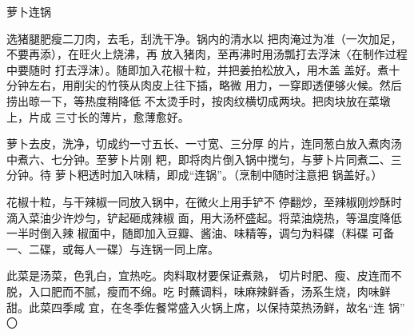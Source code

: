 \begin{recipe}{萝卜连锅}

\ingredients




\cooking

\step 选猪腿肥瘦二刀肉，去毛，刮洗干净。锅内的清水以 把肉淹过为准（一次加足，不要再添），在旺火上烧沸，再 放入猪肉，至再沸时用汤瓢打去浮沫〈在制作过程中要随时 打去浮沫）。随即加入花椒十粒，并把姜拍松放入，用木盖 盖好。煮十分钟左右，用削尖的竹筷从肉皮上往下插，略微 用力，一穿即透便够火候。然后捞出晾一下，等热度稍降低 不太烫手时，按肉纹横切成两块。把肉块放在菜墩上，片成 三寸长的薄片，愈薄愈好。

\step 萝卜去皮，洗净，切成约一寸五长、一寸宽、三分厚 的片，连同葱白放入煮肉汤中煮六、七分钟。至萝卜片刚 粑，即将肉片倒入锅中搅匀，与萝卜片同煮二、三分钟。待 萝卜粑透时加入味精，即成“连锅”。（烹制中随时注意把 锅盖好。）

\step 花椒十粒，与干辣椒一同放入锅中，在微火上用手铲不 停翻炒，至辣椒刚炒酥时滴入菜油少许炒匀，铲起砸成辣椒 面，用大汤杯盛起。将菜油烧热，等温度降低一半时倒入辣 椒面中，随即加入豆瓣、酱油、味精等，调匀为料碟（料碟 可备一、二碟，或每人一碟）与连锅一同上席。

\notes

此菜是汤菜，色乳白，宜热吃。肉料取材要保证煮熟， 切片时肥、瘦、皮连而不脱，入口肥而不腻，瘦而不绵。吃 时蘸调料，味麻辣鲜香，汤系生烧，肉味鲜甜。此菜四季咸 宜，在冬季佐餐常盛入火锅上席，以保持菜热汤鲜，故名“连 锅” 〇

\end{recipe}

